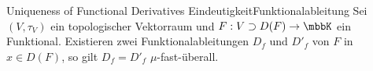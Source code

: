 \begin{msat}{Uniqueness of Functional Derivatives}
    {EindeutigkeitFunktionalableitung}
    Sei $(V,\tau_V)$ ein topologischer Vektorraum und $F:V\supset D(F)\to\mbbK$ ein Funktional. Existieren zwei Funktionalableitungen $D_f$ und $D'_f$ von $F$ in $x\in D(F)$, so gilt $D_f = D'_f$ $\mu$-fast-überall.
\end{msat}